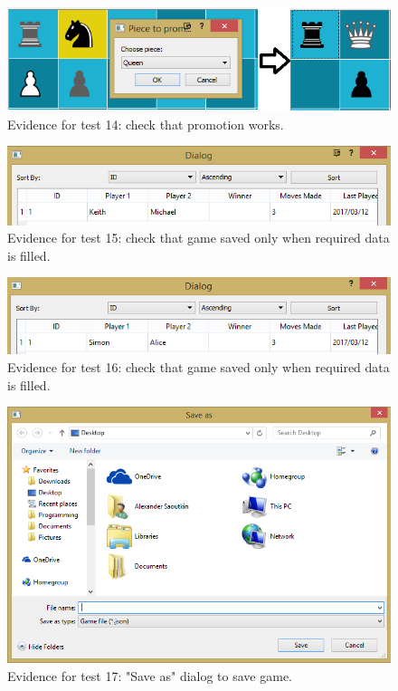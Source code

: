 \begin{figure}
	\centering
	\includegraphics[width=1.0\textwidth]{images/screenshots/test-14}
	\caption{Evidence for test 14: check that promotion works.}
	\label{test-14}
\end{figure}
\begin{figure}
	\centering
	\includegraphics[width=1.0\textwidth]{images/screenshots/test-15}
	\caption{Evidence for test 15: check that game saved only when required data is filled.}
	\label{test-15}
\end{figure}
\begin{figure}
	\centering
	\includegraphics[width=1.0\textwidth]{images/screenshots/test-16}
	\caption{Evidence for test 16: check that game saved only when required data is filled.}
	\label{test-16}
\end{figure}
\begin{figure}
	\centering
	\includegraphics[width=1.0\textwidth]{images/screenshots/test-17}
	\caption{Evidence for test 17: "Save as" dialog to save game.}
	\label{test-17}
\end{figure}
